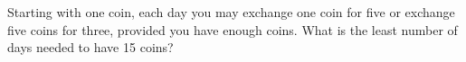 Starting with one coin, each day you may exchange one coin for five or exchange five coins for three, provided you have enough coins. What is the least number of days needed to have 15 coins?
